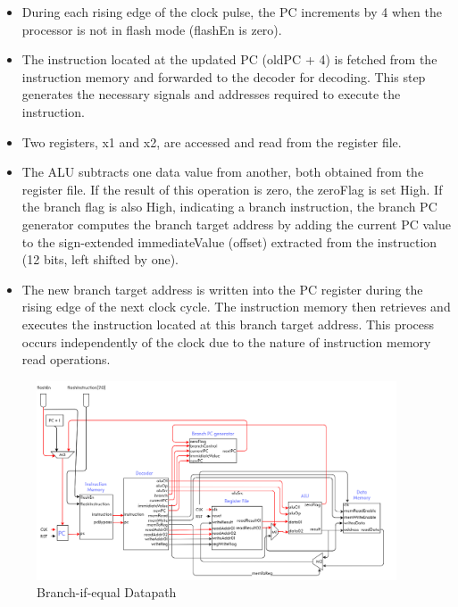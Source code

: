 \begin{itemize}
  \item  During each rising edge of the clock pulse, the PC increments by 4 when the processor is not in flash mode (flashEn is zero).
  \item The instruction located at the updated PC (oldPC + 4) is fetched from the instruction memory and forwarded to the decoder for decoding. This step generates the necessary signals and addresses required to execute the instruction.

  \item Two registers, x1 and x2, are accessed and read from the register file.
  \item The ALU subtracts one data value from another, both obtained from the register file. If the result of this operation is zero, the zeroFlag is set High. If the branch flag is also High, indicating a branch instruction, the branch PC generator computes the branch target address by adding the current PC value to the sign-extended immediateValue (offset) extracted from the instruction (12 bits, left shifted by one).
  \item The new branch target address is written into the PC register during the rising edge of the next clock cycle. The instruction memory then retrieves and executes the instruction located at this branch target address. This process occurs independently of the clock due to the nature of instruction memory read operations.
\end{itemize}

\begin{figure}[H]
    \centering
    \includegraphics[width=0.95\textwidth, height=0.4\textheight]{Image/03_beq.png}
    \caption{Branch-if-equal Datapath}
    \label{fig:Branch-if-equal Datapath}
\end{figure}

